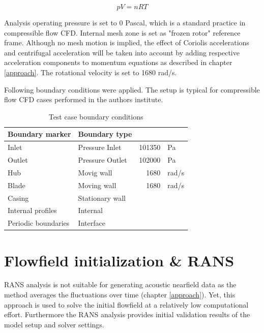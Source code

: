 \begin{equation} \label{eq:stadair}
p V = n R T
\end{equation}

Analysis operating pressure is set to 0 Pascal, which is a standard practice in compressible flow CFD. Internal mesh zone is set as "frozen rotor" reference frame. Although no mesh motion is implied, the effect of Coriolis accelerations and centrifugal acceleration will be taken into account by adding respective acceleration components to momentum equations as described in chapter \ref{approach}. The rotational velocity is set to 1680 rad/s.

Following boundary conditions were applied. The setup is typical for compressible flow CFD cases performed in the authors institute.

\begin{table}[htb!]
\centering
\caption{Test case boundary conditions} \label{tab:testbcs}
\ttfamily
\begin{tabular}{@{}llrl@{}}
\toprule
Boundary marker & Boundary type & & \\ \midrule
Inlet & Pressure Inlet & 101350  & Pa\\
Outlet & Pressure Outlet & 102000 & Pa \\
Hub & Movig wall & 1680 & rad/s \\
Blade & Moving wall & 1680 & rad/s \\
Casing & Stationary wall & &  \\
Internal profiles & Internal & & \\
Periodic boundaries & Interface & & \\ \bottomrule
\end{tabular}
\end{table}


\section{Flowfield initialization \& RANS}
RANS analysis is not suitable for generating acoustic nearfield data as the method averages the fluctuations over time (chapter \ref{approach}). Yet, this approach is used to solve the initial flowfield at a relatively low computational effort. Furthermore the RANS analysis provides initial validation results of the model setup and solver settings.

